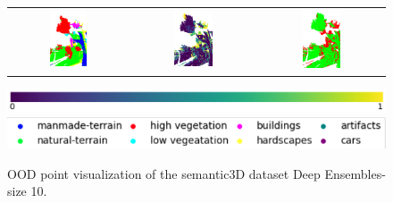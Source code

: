 \begin{figure}[h!]
\begin{tabular}{ccc}
                \includegraphics[width=0.33\textwidth, height=0.18\textheight]{images/ood_imgs/de_sem3d/de_class_prob_3.png} &
                \includegraphics[width=0.33\textwidth, height=0.18\textheight]{images/ood_imgs/de_sem3d/de_ent_10_3.png}& 
                \includegraphics[width=0.33\textwidth, height=0.18\textheight]{images/ood_imgs/de_sem3d/de_ent_ood_auroc_3.png}\\
            \end{tabular}
            \includegraphics[scale=0.45]{images/prob_legend.pdf}
            \includegraphics[scale=0.65]{images/legend.png}
            \caption{OOD point visualization of the semantic3D dataset Deep Ensembles-size 10.}
            \label{fig:de_ood_auroc_sem3d_ent}
        \end{figure}

